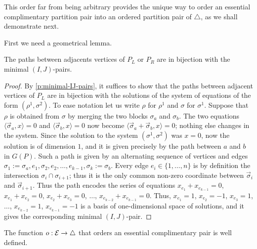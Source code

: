 This order far from being arbitrary provides the unique way to order an essential complimentary partition pair into an ordered partition pair of $\triangle$, as we shall demonstrate next.

First we need a geometrical lemma. 
\begin{proposition}
    The paths between adjacents vertices of $P_L$ or $P_R$ are in bijection with the minimal $(I,J)$-pairs.
\end{proposition}

\begin{proof}
    By \cref{p:minimal-IJ-pairs}, it suffices to show that the paths between adjacent vertices of $P_L$ are in bijection with the solutions of the system of equations of the form $(\rho^1,\sigma^2)$. 
    To ease notation let us write $\rho$ for $\rho^1$ and $\sigma$ for $\sigma^1$. 
    Suppose that $\rho$ is obtained from $\sigma$ by merging the two blocks $\sigma_a$ and $\sigma_b$. 
    The two equations $\langle \vec \sigma_a, x \rangle =0$ and $\langle \vec \sigma_b, x \rangle =0$ now become $\langle \vec \sigma_a + \vec \sigma_b, x \rangle =0$; nothing else changes in the system. 
    Since the solution to the system $(\sigma^1,\sigma^2)$ was $x=0$, now the solution is of dimension $1$, and it is given precisely by the path between $a$ and $b$ in $G(P)$.
    Such a path is given by an alternating sequence of vertices and edges $\sigma_1:=\sigma_a, e_1, \sigma_2, e_2, \ldots, e_{k-1}, \sigma_k:=\sigma_b$. 
    Every edge $e_i \in \{1,\ldots, n\}$ is by definition the intersection $\sigma_{i} \cap \sigma_{i+1}$; thus it is the only common non-zero coordinate between $\vec \sigma_{i}$ and $\vec \sigma_{i+1}$.
    Thus the path encodes the series of equations $x_{e_1}+x_{e_{k-1}}=0$, $x_{e_1}+x_{e_2}=0$, $x_{e_2}+x_{e_3}=0$, $\ldots$, $x_{e_{k-2}}+x_{e_{k-1}}=0$. 
    Thus, $x_{e_1}=1$, $x_{e_2}=-1$, $x_{e_3}=1$, $\ldots$, $x_{e_{k-2}}=1$, $x_{e_{k-1}}=-1$ is a basis of one-dimensional space of solutions, and it gives the corresponding minimal $(I,J)$-pair. 
\end{proof}

\begin{lemma} 
\label{o well defined}
The function $o:\mathcal{E} \to \triangle$ that orders an essential complimentary pair is well defined.
\end{lemma}

